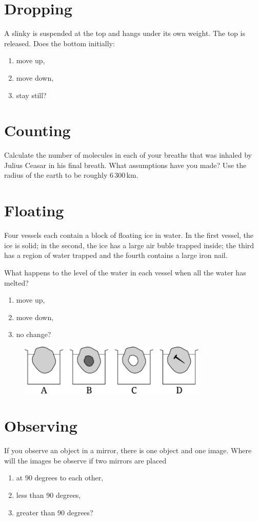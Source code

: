 \section{Dropping}
A slinky is suspended at the top and hangs under its own weight. The top is released. Does the bottom initially:
\begin{enumerate}[label=\alph*)]
	\item move up,
	\item move down,
	\item stay still?
\end{enumerate}

\section{Counting}
Calculate the number of molecules in each of your breaths that was inhaled by Julius Ceasar in his final breath. What assumptions have you made? Use the radius of the earth to be roughly 6\,300\,km.

\section{Floating}
Four vessels each contain a block of floating ice in water. In the first vessel, the ice is solid; in the second, the ice has a large air buble trapped inside; the third has a region of water trapped and the fourth contains a large iron nail.

What happens to the level of the water in each vessel when all the water has melted?
\begin{enumerate}[label=\alph*)]
	\item move up,
	\item move down,
	\item no change?
\end{enumerate}
\begin{figure}[ht]
  \centering
  \includegraphics[width=0.8\textwidth]{vessels.pdf}
\end{figure}

\section{Observing}
If you observe an object in a mirror, there is one object and one image. Where will the images be observe if two mirrors are placed 
\begin{enumerate}[label=\alph*)]
	\item at 90 degrees to each other,
	\item less than 90 degrees,
	\item greater than 90 degrees?
\end{enumerate}

